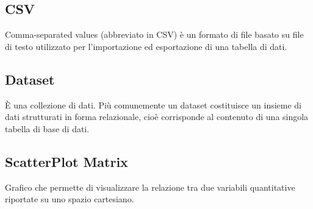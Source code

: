 \documentclass[../manuale_utente.tex]{subfiles}
\begin{document}
\subsection*{CSV}
{}
Comma-separated values (abbreviato in CSV) è un formato di file basato su file di testo utilizzato per l'importazione ed esportazione di una tabella di dati.

\subsection*{Dataset}
{}
È una collezione di dati. Più comunemente un dataset costituisce un insieme di dati strutturati in forma relazionale, cioè corrisponde al contenuto di una singola tabella di base di dati.

\subsection*{ScatterPlot Matrix}
{}
Grafico che permette di visualizzare la relazione tra due variabili quantitative riportate su uno spazio cartesiano.
\end{document}
